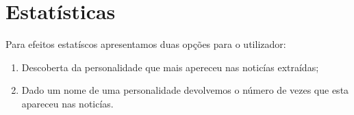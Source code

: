 \section{Estatísticas}

Para efeitos estatíscos apresentamos duas opções para o utilizador:

\begin{enumerate}
  \item Descoberta da personalidade que mais apereceu nas noticías extraídas;
  \item Dado um nome de uma personalidade devolvemos o número de vezes que esta apareceu nas noticías.
\end{enumerate}
